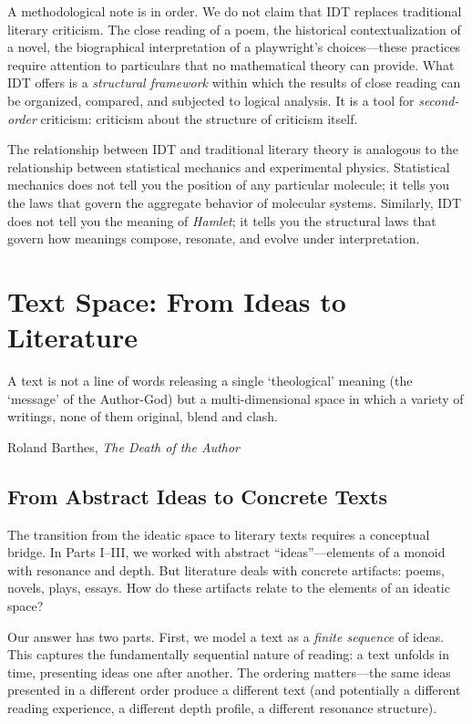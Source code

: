 \documentclass[11pt,openany]{book}
\theoremstyle{definition}
\theoremstyle{plain}
\theoremstyle{remark}
\begin{document}
A methodological note is in order. We do not claim that IDT replaces traditional literary criticism. The close reading of a poem, the historical contextualization of a novel, the biographical interpretation of a playwright's choices---these practices require attention to particulars that no mathematical theory can provide. What IDT offers is a \emph{structural framework} within which the results of close reading can be organized, compared, and subjected to logical analysis. It is a tool for \emph{second-order} criticism: criticism about the structure of criticism itself.

The relationship between IDT and traditional literary theory is analogous to the relationship between statistical mechanics and experimental physics. Statistical mechanics does not tell you the position of any particular molecule; it tells you the laws that govern the aggregate behavior of molecular systems. Similarly, IDT does not tell you the meaning of \emph{Hamlet}; it tells you the structural laws that govern how meanings compose, resonate, and evolve under interpretation.

\chapter{Text Space: From Ideas to Literature}
\label{ch:text-space}

\epigraph{A text is not a line of words releasing a single `theological' meaning (the `message' of the Author-God) but a multi-dimensional space in which a variety of writings, none of them original, blend and clash.}{Roland Barthes, \textit{The Death of the Author}}

\section{From Abstract Ideas to Concrete Texts}

The transition from the ideatic space to literary texts requires a conceptual bridge. In Parts I--III, we worked with abstract ``ideas''---elements of a monoid with resonance and depth. But literature deals with concrete artifacts: poems, novels, plays, essays. How do these artifacts relate to the elements of an ideatic space?

Our answer has two parts. First, we model a text as a \emph{finite sequence} of ideas. This captures the fundamentally sequential nature of reading: a text unfolds in time, presenting ideas one after another. The ordering matters---the same ideas presented in a different order produce a different text (and potentially a different reading experience, a different depth profile, a different resonance structure).
\end{document}

